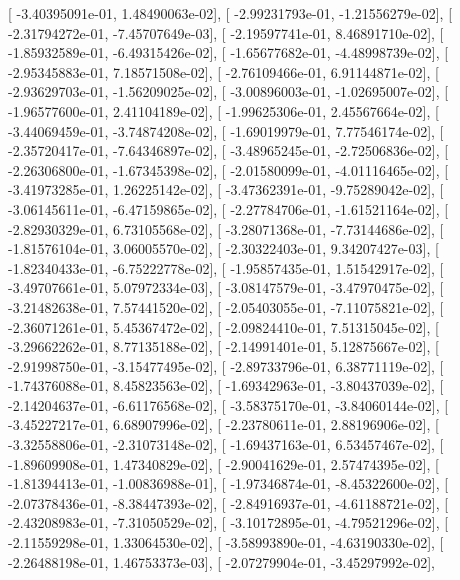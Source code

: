 \documentclass{article}
\begin{document}
       [ -3.40395091e-01,   1.48490063e-02],
       [ -2.99231793e-01,  -1.21556279e-02],
       [ -2.31794272e-01,  -7.45707649e-03],
       [ -2.19597741e-01,   8.46891710e-02],
       [ -1.85932589e-01,  -6.49315426e-02],
       [ -1.65677682e-01,  -4.48998739e-02],
       [ -2.95345883e-01,   7.18571508e-02],
       [ -2.76109466e-01,   6.91144871e-02],
       [ -2.93629703e-01,  -1.56209025e-02],
       [ -3.00896003e-01,  -1.02695007e-02],
       [ -1.96577600e-01,   2.41104189e-02],
       [ -1.99625306e-01,   2.45567664e-02],
       [ -3.44069459e-01,  -3.74874208e-02],
       [ -1.69019979e-01,   7.77546174e-02],
       [ -2.35720417e-01,  -7.64346897e-02],
       [ -3.48965245e-01,  -2.72506836e-02],
       [ -2.26306800e-01,  -1.67345398e-02],
       [ -2.01580099e-01,  -4.01116465e-02],
       [ -3.41973285e-01,   1.26225142e-02],
       [ -3.47362391e-01,  -9.75289042e-02],
       [ -3.06145611e-01,  -6.47159865e-02],
       [ -2.27784706e-01,  -1.61521164e-02],
       [ -2.82930329e-01,   6.73105568e-02],
       [ -3.28071368e-01,  -7.73144686e-02],
       [ -1.81576104e-01,   3.06005570e-02],
       [ -2.30322403e-01,   9.34207427e-03],
       [ -1.82340433e-01,  -6.75222778e-02],
       [ -1.95857435e-01,   1.51542917e-02],
       [ -3.49707661e-01,   5.07972334e-03],
       [ -3.08147579e-01,  -3.47970475e-02],
       [ -3.21482638e-01,   7.57441520e-02],
       [ -2.05403055e-01,  -7.11075821e-02],
       [ -2.36071261e-01,   5.45367472e-02],
       [ -2.09824410e-01,   7.51315045e-02],
       [ -3.29662262e-01,   8.77135188e-02],
       [ -2.14991401e-01,   5.12875667e-02],
       [ -2.91998750e-01,  -3.15477495e-02],
       [ -2.89733796e-01,   6.38771119e-02],
       [ -1.74376088e-01,   8.45823563e-02],
       [ -1.69342963e-01,  -3.80437039e-02],
       [ -2.14204637e-01,  -6.61176568e-02],
       [ -3.58375170e-01,  -3.84060144e-02],
       [ -3.45227217e-01,   6.68907996e-02],
       [ -2.23780611e-01,   2.88196906e-02],
       [ -3.32558806e-01,  -2.31073148e-02],
       [ -1.69437163e-01,   6.53457467e-02],
       [ -1.89609908e-01,   1.47340829e-02],
       [ -2.90041629e-01,   2.57474395e-02],
       [ -1.81394413e-01,  -1.00836988e-01],
       [ -1.97346874e-01,  -8.45322600e-02],
       [ -2.07378436e-01,  -8.38447393e-02],
       [ -2.84916937e-01,  -4.61188721e-02],
       [ -2.43208983e-01,  -7.31050529e-02],
       [ -3.10172895e-01,  -4.79521296e-02],
       [ -2.11559298e-01,   1.33064530e-02],
       [ -3.58993890e-01,  -4.63190330e-02],
       [ -2.26488198e-01,   1.46753373e-03],
       [ -2.07279904e-01,  -3.45297992e-02],
\end{document}

